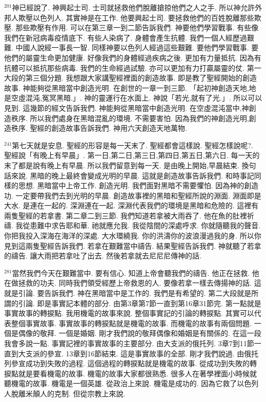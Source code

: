 \documentclass{book}
\begin{document}
$^{201}$神已經說了.
神興起士司.
士司就拯救他們脫離搶掠他們之人之手.
所以神允許外邦人欺壓以色列人.
其實神是在工作.
他要興起士司.
要拯救他們的百姓脫離那些欺壓.
那些欺壓有作用.
可以在第三章一到二節告訴我們.
神要他們學習戰事.
有些像我們在新冠病毒疫情底下.
有些人染病了.
身體會產生抗體.
我們一個人經歷過艱難.
中國人說經一事長一智.
同樣神要以色列人經過這些艱難.
要他們學習戰事.
要他們的屬靈生命更加健康.
好像我們的身體經過疾病之後.
更加有力量抵抗.
因為有抗體可以抵抗那些病毒.
我們的生命經過試驗.
亦可以更加有力打贏屬靈的仗.
第一大段的第三個分題.
我想跟大家講聖經裡面的創造故事.
即是教了聖經開始的創造故事.
神能夠從黑暗當中創造光明.
在創世的一章一到三節.
「起初神創造天地,地是空虛混沌,冤冥黑暗.」.
神的靈運行在水面上.
神說「若光,就有了光.」.
所以可以見到.
這幾節的經文告訴我們.
神能夠從黑暗當中創造光明.
在空虛混沌當中,神創造秩序.
所以我們處身在黑暗混亂的環境.
不需要害怕.
因為我們的神創造光明,創造秩序.
聖經的創造故事告訴我們.
神用六天創造天地萬物.

$^{241}$第七天就是安息.
聖經的形容是每一天末了.
聖經都會這樣說.
聖經怎樣說呢?.
聖經說「有晚上有早晨」.
第一日,第二日,第三日,第四日,第五日,第六日.
每一天的末了都是說有晚上有早晨.
所以我們留意到每一天.
是由晚上開始,早晨結束.
換句話來說.
黑暗的晚上最終會變成光明的早晨.
這就是創造故事告訴我們.
和時事記同樣的思想.
黑暗當中上帝工作.
創造光明.
我們面對黑暗不需要懼怕.
因為神的創造功.
一定要帶我們去到光明的早晨.
創造故事裡的黑暗和聖經所說的淵面.
淵面即是大水.
是連在一起的.
深淵連在一起.
深淵代表我們的環境是黑暗和危險的.
這裡有兩隻聖經的若拿書.
第二章二到三節.
我們知道若拿被大雨吞了.
他在魚的肚裡祈禱.
我從患難中求告耶和華.
祂就應允我.
我從陰間的深處呼求.
你就隨聽我的聲音.
你把我投入深海在海洋的深處.
大水環繞我.
你的洪濤你的波浪漫過我的身.
所以你見到這兩隻聖經告訴我們.
若拿在艱難當中禱告.
結果聖經告訴我們.
神就聽了若拿的禱告.
讓大雨把若拿吐了出去.
然後若拿就去尼尼尼傳神的話.

$^{281}$當然我們今天在艱難當中.
要有信心.
知道上帝會聽我們的禱告.
他正在拯救.
他在做拯救的功夫.
同時我們領受經歷上帝救恩的人.
要像若拿一樣去傳揚神的話.
這就是引論.
要告訴我們.
神在黑暗當中是工作的.
我們是有希望的.
第二大段就是所謂的引論.
即是事實記本體的部分.
由第3章第7節一直到第16章31節完.
第一點就是事實故事的轉捩點.
我用機電的故事來說.
整個事實記的引論的轉捩點.
其實可以代表整個事實故事.
事實故事的轉捩點就是機電的故事.
而機電的故事有兩個問題.
一個是偶像的敬拜.
一個是婚姻.
剛才我們說的敬拜偶像和婚姻是有關係的.
在這一段我會多說一點.
事實記裡的事實故事的主要部分.
由大支派的俄托列.
3章7到11節一直到大支派的參宣.
13章到16節結束.
這是事實故事的全部.
剛才我們說過.
由俄托列參宣成功到失敗的過程.
這個過程的轉捩點就是機電的故事.
從成功到失敗的轉捩點就是要看機電的故事.
機電的故事大家都很熟悉.
很多人在著學裡面小時候就聽機電的故事.
機電是一個英雄.
從政治上來說.
機電是成功的.
因為它救了以色列人脫離米顛人的克制.
但從宗教上來說.
\end{document}
